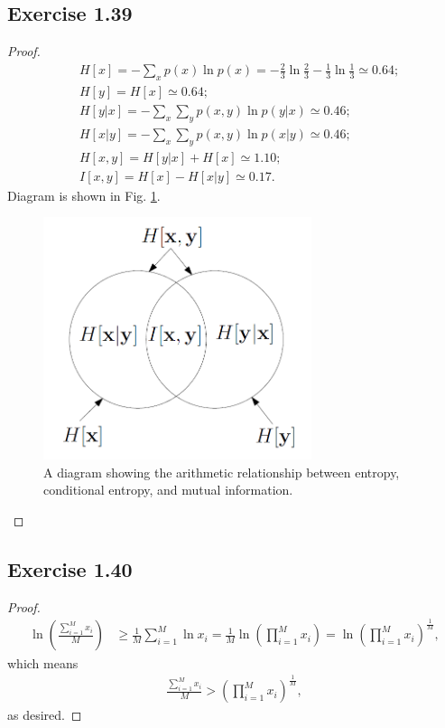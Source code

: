 \documentclass[11pt]{article}
\theoremstyle{definition}
\begin{document}
\subsection{Exercise 1.39}
\begin{proof}
\begin{align*}
&H[x] = -\sum_{x}p(x)\ln p(x) = -\frac{2}{3}\ln \frac{2}{3} -\frac{1}{3}\ln \frac{1}{3} \simeq 0.64;\\
&H[y] = H[x] \simeq 0.64; \\
&H[y|x] =  -\sum_x\sum_yp(x,y)\ln p(y|x) \simeq 0.46;\\
&H[x|y] =  -\sum_x\sum_yp(x,y)\ln p(x|y) \simeq 0.46;\\
&H[x,y] = H[y|x] + H[x] \simeq 1.10; \\
&I[x,y] = H[x] - H[x|y] \simeq 0.17.
\end{align*}
Diagram is shown in Fig. \ref{fig:fig1}.
\begin{figure}[!hbtp] 
\centering 
\includegraphics[width=0.7\textwidth]{res/ch1-ex39.png} 
\caption{A diagram showing the arithmetic relationship between entropy, conditional entropy, and mutual information.} 
\label{fig:fig1} 
\end{figure}
\end{proof}

\subsection{Exercise 1.40}
\begin{proof}
\begin{align*}
\ln\left(\frac{\sum_{i=1}^Mx_i}{M}\right) &\geq \frac{1}{M}\sum_{i=1}^M\ln x_i 
= \frac{1}{M}\ln\left(\prod_{i=1}^Mx_i\right) 
= \ln\left(\prod_{i=1}^Mx_i\right)^{\frac{1}{M}},
\end{align*}
which means
\begin{align*}
\frac{\sum_{i=1}^Mx_i}{M} > \left(\prod_{i=1}^Mx_i\right)^{\frac{1}{M}},
\end{align*}
as desired.
\end{proof}
\end{document}
